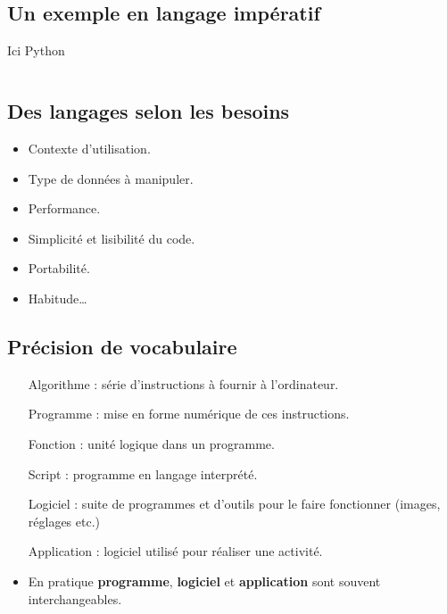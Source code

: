 \subsection{Un exemple en langage impératif}
\begin{slide}
	\begin{exampleblock}{Ici Python}
		\inputminted{python}{exemples-manipulation/python.py}
	\end{exampleblock}
\end{slide}

\subsection{Des langages selon les besoins}
\begin{slide}
	\begin{itemize}
		\item Contexte d'utilisation.
		\item Type de données à manipuler.
		\item Performance.
		\item Simplicité et lisibilité du code.
		\item Portabilité.
		\item Habitude… 
	\end{itemize}
\end{slide}

\subsection{Précision de vocabulaire}
\begin{slide}
	\small
	\begin{itemize}
		\item[Algorithme] : série d'instructions à fournir à l'ordinateur.
		\item[Programme] : mise en forme numérique de ces instructions. %
		\item[Fonction] : unité logique dans un programme. %
		\item[Script] : programme en langage interprété. %
		\item[Logiciel] : suite de programmes et d'outils pour le faire fonctionner (images, réglages etc.)
		\item[Application] : logiciel utilisé pour réaliser une activité. %
		\item En pratique \textbf{programme}, \textbf{logiciel} et \textbf{application} sont souvent interchangeables.
	\end{itemize}


\end{slide}